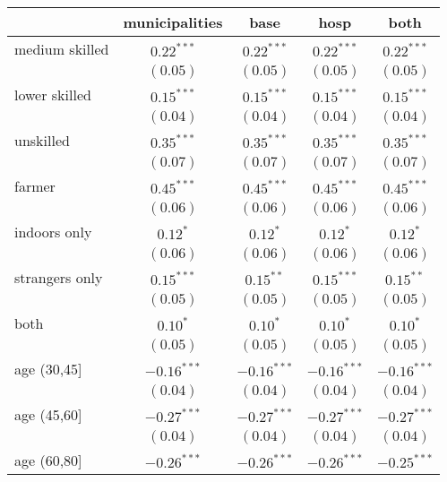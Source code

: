 
\begin{table}
\begin{center}
\begin{tabular}{l c c c c}
\hline
 & municipalities & base & hosp & both \\
\hline
medium skilled       & $0.22^{***}$  & $0.22^{***}$  & $0.22^{***}$  & $0.22^{***}$  \\
                     & $(0.05)$      & $(0.05)$      & $(0.05)$      & $(0.05)$      \\
lower skilled        & $0.15^{***}$  & $0.15^{***}$  & $0.15^{***}$  & $0.15^{***}$  \\
                     & $(0.04)$      & $(0.04)$      & $(0.04)$      & $(0.04)$      \\
unskilled            & $0.35^{***}$  & $0.35^{***}$  & $0.35^{***}$  & $0.35^{***}$  \\
                     & $(0.07)$      & $(0.07)$      & $(0.07)$      & $(0.07)$      \\
farmer               & $0.45^{***}$  & $0.45^{***}$  & $0.45^{***}$  & $0.45^{***}$  \\
                     & $(0.06)$      & $(0.06)$      & $(0.06)$      & $(0.06)$      \\
indoors only         & $0.12^{*}$    & $0.12^{*}$    & $0.12^{*}$    & $0.12^{*}$    \\
                     & $(0.06)$      & $(0.06)$      & $(0.06)$      & $(0.06)$      \\
strangers only       & $0.15^{***}$  & $0.15^{**}$   & $0.15^{***}$  & $0.15^{**}$   \\
                     & $(0.05)$      & $(0.05)$      & $(0.05)$      & $(0.05)$      \\
both                 & $0.10^{*}$    & $0.10^{*}$    & $0.10^{*}$    & $0.10^{*}$    \\
                     & $(0.05)$      & $(0.05)$      & $(0.05)$      & $(0.05)$      \\
age (30,45]          & $-0.16^{***}$ & $-0.16^{***}$ & $-0.16^{***}$ & $-0.16^{***}$ \\
                     & $(0.04)$      & $(0.04)$      & $(0.04)$      & $(0.04)$      \\
age (45,60]          & $-0.27^{***}$ & $-0.27^{***}$ & $-0.27^{***}$ & $-0.27^{***}$ \\
                     & $(0.04)$      & $(0.04)$      & $(0.04)$      & $(0.04)$      \\
age (60,80]          & $-0.26^{***}$ & $-0.26^{***}$ & $-0.26^{***}$ & $-0.25^{***}$ \\

\end{tabular}
\end{center}
\end{table}
